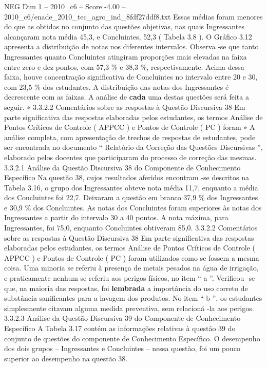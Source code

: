 \begin{textsample}{NEG Dim 1 – 2010\_c6 – Score -4.00 – 2010\_c6/enade\_2010\_tec\_agro\_ind\_8fdf27ddf8.txt}
Essas médias foram menores do que as obtidas no conjunto das questões objetivas, nas quais Ingressantes alcançaram nota média 45,3, e Concluintes, 52,3 ( Tabela 3.8 ).
O Gráfico 3.12 apresenta a distribuição de notas nos diferentes intervalos.
Observa -se que tanto Ingressantes quanto Concluintes atingiram proporções mais elevadas na faixa entre zero e dez pontos, com 57,3 \% e 38,3 \%, respectivamente.
Acima dessa faixa, houve concentração significativa de Concluintes no intervalo entre 20 e 30, com 23,5 \% dos estudantes.
A distribuição das notas dos Ingressantes é decrescente com as faixas.
A análise de \textbf{cada} uma destas questões será feita a seguir. ∗ 3.3.2.2 Comentários sobre as respostas à Questão Discursiva 38 Em parte significativa das respostas elaboradas pelos estudantes, os termos Análise de Pontos Críticos de Controle ( APPCC ) e Pontos de Controle ( PC ) foram ∗ A análise completa, com apresentação de trechos de respostas de estudantes, pode ser encontrada no documento “ Relatório da Correção das Questões Discursivas ”, elaborado pelos docentes que participaram do processo de correção das mesmas. 3.3.2.1 Análise da Questão Discursiva 38 do Componente de Conhecimento Específico Na questão 38, cujos resultados aferidos encontram -se descritos na Tabela 3.16, o grupo dos Ingressantes obteve nota média 11,7, enquanto a média dos Concluintes foi 22,7.
Deixaram a questão em branco 37,9 \% dos Ingressantes e 30,9 \% dos Concluintes.
As notas dos Concluintes foram superiores às notas dos Ingressantes a partir do intervalo 30 a 40 pontos.
A nota máxima, para Ingressantes, foi 75,0, enquanto Concluintes obtiveram 85,0. 3.3.2.2 Comentários sobre as respostas à Questão Discursiva 38 Em parte significativa das respostas elaboradas pelos estudantes, os termos Análise de Pontos Críticos de Controle ( APPCC ) e Pontos de Controle ( PC ) foram utilizados como se fossem a mesma coisa.
Uma minoria se referiu à presença de metais pesados na água de irrigação, e praticamente nenhum se referiu aos perigos físicos, no item “ a ”.
Verificou -se que, na maioria das respostas, foi \textbf{lembrada} a importância do uso correto de substância sanificantes para a lavagem dos produtos.
No item “ b ”, os estudantes simplesmente citavam alguma medida preventiva, sem relacioná -la aos perigos. 3.3.2.3 Análise da Questão Discursiva 39 do Componente de Conhecimento Específico A Tabela 3.17 contém as informações relativas à questão 39 do conjunto de questões do componente de Conhecimento Específico.
O desempenho dos dois grupos – Ingressantes e Concluintes – nessa questão, foi um pouco superior ao desempenho na questão 38.

\end{textsample}
